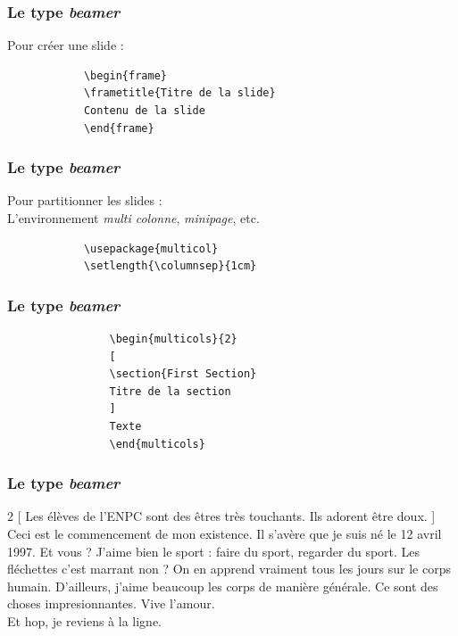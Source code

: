 \documentclass[handout]{beamer}
\begin{document}
\begin{frame}[fragile=singleslide]
	\frametitle{Le type \textit{beamer}}
	\centering
	Pour créer une slide :

			\begin{verbatim}
			\begin{frame}
			\frametitle{Titre de la slide}
			Contenu de la slide
			\end{frame}
			\end{verbatim}

\end{frame}

\begin{frame}[fragile=singleslide]
	\frametitle{Le type \textit{beamer}}
	\centering
	Pour partitionner les slides :\\
	L'environnement \textit{multi colonne}, \textit{minipage}, etc.

			\begin{verbatim}
			\usepackage{multicol}
			\setlength{\columnsep}{1cm}
			\end{verbatim}

\end{frame}

\begin{frame}[fragile=singleslide]
	\frametitle{Le type \textit{beamer}}
	\centering

			\begin{verbatim}
				\begin{multicols}{2}
				[
				\section{First Section}
				Titre de la section
				]
				Texte
				\end{multicols}
			\end{verbatim}

\end{frame}

\begin{frame}
	\frametitle{Le type \textit{beamer}}

	\begin{multicols}{2}
	[
	Les élèves de l'ENPC sont des êtres très touchants. Ils adorent être doux.
	]
	Ceci est le commencement de mon existence. Il s'avère que je suis né le 12 avril 1997. Et vous ? J'aime bien le sport : faire du sport, regarder du sport. Les fléchettes c'est marrant non ? On en apprend vraiment tous les jours sur le corps humain. D'ailleurs, j'aime beaucoup les corps de manière générale. Ce sont des choses impresionnantes. Vive l'amour.\\

	\indent Et hop, je reviens à la ligne.
	\end{multicols}

\end{frame}
\end{document}

